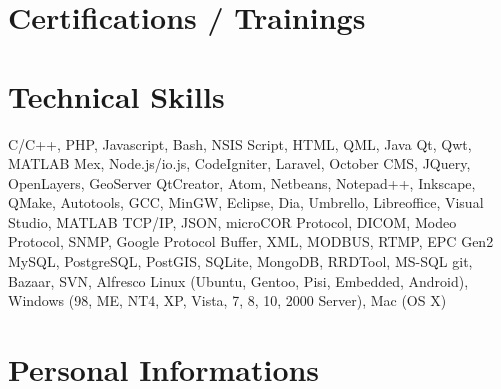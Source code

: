 \documentclass{moderncv}                          %
\begin{document}
\section{Certifications / Trainings}




\section{Technical Skills}

{C/C++, PHP, Javascript, Bash, NSIS Script, HTML, QML, Java}
{Qt, Qwt, MATLAB Mex, Node.js/io.js, CodeIgniter, Laravel, October CMS, JQuery, OpenLayers, GeoServer}
{QtCreator, Atom, Netbeans, Notepad++, Inkscape, QMake, Autotools, GCC, MinGW, Eclipse, Dia, Umbrello, Libreoffice, Visual Studio, MATLAB}
{TCP/IP, JSON, microCOR Protocol, DICOM, Modeo Protocol, SNMP, Google Protocol Buffer, XML, MODBUS, RTMP, EPC Gen2}
{MySQL, PostgreSQL, PostGIS, SQLite, MongoDB, RRDTool, MS-SQL}
{git, Bazaar, SVN, Alfresco}
{Linux (Ubuntu, Gentoo, Pisi, Embedded, Android), Windows (98, ME, NT4, XP, Vista, 7, 8, 10, 2000 Server), Mac (OS X)}



\section{Personal Informations}


\nocite{*}
%
\end{document}
